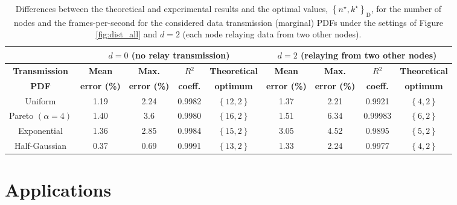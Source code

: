 \documentclass[twocolumn,english]{IEEEtran}
\providecommand{\tabularnewline}{\\}
\theoremstyle{plain}
\theoremstyle{definition}
\begin{document}
\begin{table*}
\begin{centering}
\caption{Differences between the theoretical and experimental results and the
optimal values, $\left\{ n^{\star},k^{\star}\right\} _{\text{D}}$,
for the number of nodes and the frames-per-second for the considered
data transmission (marginal) PDFs under the settings of Figure \ref{fig:dist_all}
and $d=2$ (each node relaying data from two other nodes).\label{tab:Diff-theory&experiment-1-1}}

\par\end{centering}

\centering{}\begin{tabular}{|c|c|c|c|c|c|c|c|c|}
\hline 
 & \multicolumn{4}{c|}{\textbf{$d=0$ (no relay transmission)}} & \multicolumn{4}{c|}{\textbf{$d=2$ (relaying from two other nodes)}}\tabularnewline
\hline 
\textbf{Transmission}  & \textbf{Mean}  & \textbf{Max.}  & \textbf{$R{}^{2}$}  & \textbf{Theoretical}  & \textbf{Mean}  & \textbf{Max.}  & \textbf{$R{}^{2}$}  & \textbf{Theoretical} \tabularnewline
\textbf{PDF}  & \textbf{error (\%)}  & \textbf{error (\%)}  & \textbf{coeff.}  & \textbf{optimum} & \textbf{error (\%)}  & \textbf{error (\%)}  & \textbf{coeff.}  & \textbf{optimum}\tabularnewline
\hline 
\hline 
Uniform  & 1.19  & 2.24  & 0.9982  & $\left\{ 12,2\right\} $  & 1.37  & 2.21  & 0.9921  & $\left\{ 4,2\right\} $ \tabularnewline
\hline 
Pareto $(\alpha=4)$  & 1.40  & 3.6  & 0.9980  & $\left\{ 16,2\right\} $  & 1.51  & 6.34  & 0.99983  & $\left\{ 6,2\right\} $ \tabularnewline
\hline 
Exponential  & 1.36  & 2.85  & 0.9984  & $\left\{ 15,2\right\} $  & 3.05  & 4.52  & 0.9895  & $\left\{ 5,2\right\} $ \tabularnewline
\hline 
Half-Gaussian  & 0.37  & 0.69  & 0.9991  & $\left\{ 13,2\right\} $  & 1.33  & 2.24  & 0.9977  & $\left\{ 4,2\right\} $ \tabularnewline
\hline 
\end{tabular}
\end{table*}



\section{Applications\label{sec:Applications}}
\end{document}
